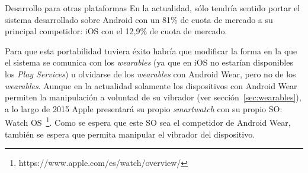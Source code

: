 \begin{definitionlist}
  \item[Desarrollo para otras plataformas] En la actualidad, sólo tendría sentido portar el sistema
    desarrollado sobre Android con un 81\% de cuota de mercado a su principal competidor: iOS
    con el 12,9\% de cuota de mercado.

    Para que esta portabilidad tuviera éxito habría que modificar la forma en la que el sistema se
    comunica con los \emph{wearables} (ya que en iOS no estarían disponibles los \emph{Play
      Services}) u olvidarse de los \emph{wearables} con Android Wear, pero no de los
    \emph{wearables}. Aunque en la actualidad solamente los dispositivos con Android Wear permiten
    la manipulación a voluntad de su vibrador (ver sección~\ref{sec:wearables}), a lo largo de 2015
    Apple presentará su propio \emph{smartwatch} con su propio \acs{SO}: Watch
    OS~\footnote{https://www.apple.com/es/watch/overview/}. Como se espera que este \acs{SO} sea el
    competidor de Android Wear, también se espera que permita manipular el vibrador del dispositivo.

\end{definitionlist} 

